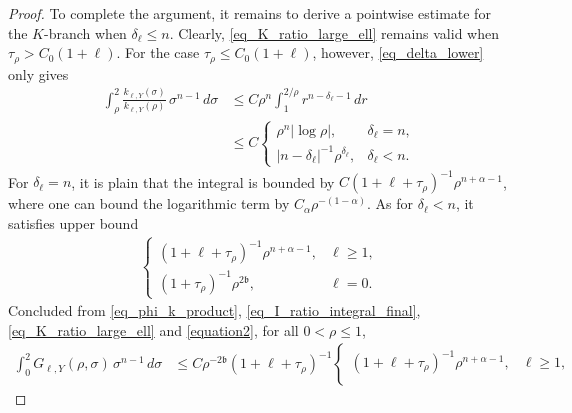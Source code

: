 \documentclass[10pt,a4paper]{amsart}
\begin{document}
\begin{proof}
To complete the argument, it remains to derive a pointwise estimate for the $K$-branch when $\delta_\ell \le n$. Clearly, \eqref{eq_K_ratio_large_ell} remains valid when $\tau_\rho > C_0(1+\ell)$. For the case $\tau_\rho \le C_0(1+\ell)$, however, \eqref{eq_delta_lower} only gives
\begin{align*}
    \int_\rho^2 \frac{k_{\ell,Y}(\sigma)}{k_{\ell,Y}(\rho)} \, \sigma^{n-1} \, d\sigma
    &\le C \rho^n \int_1^{2/\rho} r^{n-\delta_\ell-1}\,dr\\
    &\le C \begin{cases}
        \rho^n |\log{\rho}|, & \delta_\ell = n,\\
        |n-\delta_\ell|^{-1} \rho^{\delta_\ell}, & \delta_\ell < n.
    \end{cases}
\end{align*}
For $\delta_\ell=n$, it is plain that the integral is bounded by $C(1+\ell+\tau_\rho)^{-1} \rho^{n+\alpha-1}$, where one can bound the logarithmic term by $C_\alpha \rho^{-(1-\alpha)}$. As for $\delta_\ell<n$, it satisfies upper bound
\begin{align}\label{equation2}
    \begin{cases}
        (1+\ell+\tau_\rho)^{-1} \rho^{n+\alpha-1}, & \ell \ge 1,\\
        (1+\tau_\rho)^{-1} \rho^{2\mathfrak b}, & \ell=0.
    \end{cases}
\end{align}
Concluded from \eqref{eq_phi_k_product}, \eqref{eq_I_ratio_integral_final}, \eqref{eq_K_ratio_large_ell} and \eqref{equation2}, for all $0<\rho \le 1$,
\begin{align*}
    \int_0^2
        G_{\ell,Y}(\rho,\sigma)
    \, \sigma^{n-1} \, d\sigma
    &\le C \rho^{-2 \mathfrak b} (1+\ell+\tau_\rho)^{-1} \begin{cases}
        (1+\ell+\tau_\rho)^{-1} \rho^{n+\alpha-1}, & \ell \ge 1,\\

\end{cases}
\end{align*}
\end{proof}
\end{document}
